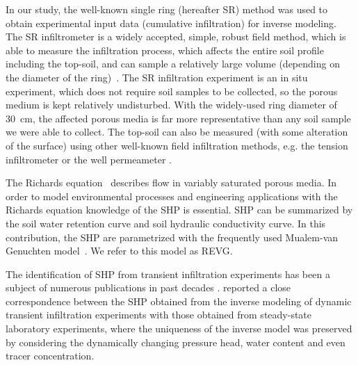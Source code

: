 \documentclass[review,times,3p,10pt]{elsarticle}
\begin{document}
In our study, the well-known single ring (hereafter SR) method was used to obtain experimental input data (cumulative infiltration) for inverse modeling. The SR infiltrometer is a widely accepted, simple, robust field method, which is able to measure the infiltration process, which affects the entire soil profile including the top-soil,  and can sample a relatively large volume (depending on the diameter of the ring)~\citep{Cheng,ReynoldsWD}.  The SR infiltration experiment is an in situ experiment, which does not require soil samples to be collected, so the porous medium is kept relatively undisturbed. With the widely-used ring diameter of 30~cm, the affected porous media is far more representative than any soil sample we were able to collect. The top-soil can also be measured (with some alteration of the surface) using other well-known field infiltration methods, e.g. the tension infiltrometer or the well permeameter  \citep{AnguloJaramillo,ReynoldsWDGP}. 

The Richards equation~\citep{richards} describes flow in variably saturated porous media. In order to model environmental processes and engineering applications with the Richards equation knowledge of the SHP is essential. SHP can be summarized by the soil water retention curve and soil hydraulic conductivity curve. In this contribution, the SHP are parametrized with the frequently used Mualem-van Genuchten model~\citep{vangenuchten}. We refer to this model as REVG.







 
The identification of SHP from transient infiltration experiments has been a subject of numerous publications in past decades \citep{simunek-infiltr2shp, infiltr2shp, simunek2-infiltr2shp, XU201234, BAGARELLO201770,  hess-Younes-2017}.  \cite{simunek-infiltr2shp} reported a close correspondence between the SHP obtained from the inverse modeling of dynamic transient infiltration experiments with those obtained from steady-state laboratory experiments, where the uniqueness of the inverse model was preserved by considering the dynamically changing pressure head, water content and even tracer concentration.
\end{document}
